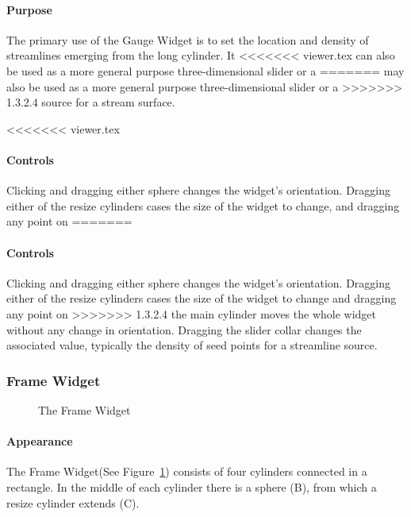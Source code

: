 \paragraph{Purpose} The primary use of the Gauge Widget is to set the
location and density of streamlines emerging from the long cylinder.  It
<<<<<<< viewer.tex
can also be used as a more general purpose three-dimensional slider or a
=======
may also be used as a more general purpose three-dimensional slider or a
>>>>>>> 1.3.2.4
source for a stream surface. 

<<<<<<< viewer.tex
\paragraph{Controls} Clicking and dragging either sphere changes the widget's orientation.  Dragging either of the resize
cylinders cases the size of the widget to change, and dragging any point on
=======
\paragraph{Controls} Clicking and dragging either sphere changes the widget's orientation.  Dragging either of the resize
cylinders cases the size of the widget to change and dragging any point on
>>>>>>> 1.3.2.4
the main cylinder moves the whole widget without any change in orientation.
Dragging the slider collar changes the associated value, typically the
density of seed points for a streamline source.

\subsubsection{Frame Widget}
\label{sec:view-framewidget} 

\begin{figure}[htb]
  \begin{makeimage}
  \end{makeimage}
  \framewidget
  \caption{\label{fig:framewidget} The Frame Widget}
\end{figure}


\paragraph{Appearance} The
Frame Widget(See Figure~\ref{fig:framewidget}) consists of four cylinders connected in a rectangle.  In
the middle of each cylinder there is a sphere (B), from which
a resize cylinder extends (C).

